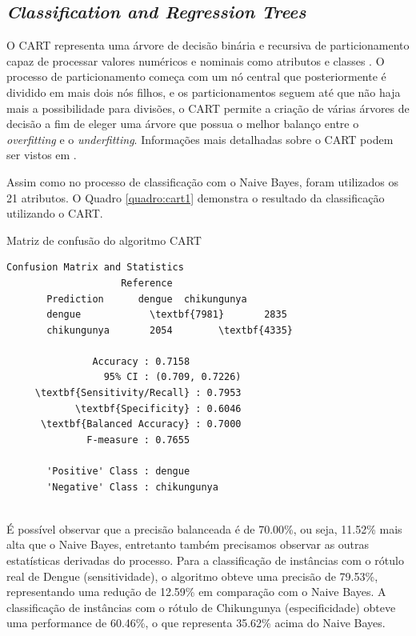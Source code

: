 \subsection{\textit{Classification and Regression Trees}}

O CART representa uma árvore de decisão binária e recursiva de particionamento capaz de processar valores numéricos e nominais como atributos e classes \cite{steinberg2009cart}. O processo de particionamento começa com um nó central que posteriormente é dividido em mais dois nós filhos, e os particionamentos seguem até que não haja mais a possibilidade para divisões, o CART permite a criação de várias árvores de decisão a fim de eleger uma árvore que possua o melhor balanço entre o \textit{overfitting} e o \textit{underfitting}. Informações mais detalhadas sobre o CART podem ser vistos em .

Assim como no processo de classificação com o Naive Bayes, foram utilizados os 21 atributos. O Quadro \ref{quadro:cart1} demonstra o resultado da classificação utilizando o CART.


\begin{quadro}
\caption{\label{quadro:cart1}Matriz de confusão do algoritmo CART}
\begingroup
    \fontsize{10pt}{9pt}\selectfont
    \begin{Verbatim}[commandchars=\\\{\}]
      Confusion Matrix and Statistics
                    Reference
       Prediction      dengue  chikungunya
       dengue            \textbf{7981}       2835
       chikungunya       2054        \textbf{4335}
                                         
               Accuracy : 0.7158         
                 95% CI : (0.709, 0.7226)
     \textbf{Sensitivity/Recall} : 0.7953         
            \textbf{Specificity} : 0.6046         
      \textbf{Balanced Accuracy} : 0.7000
              F-measure : 0.7655        
         
       'Positive' Class : dengue 
       'Negative' Class : chikungunya
  
    \end{Verbatim}  
\endgroup
{}
\end{quadro}

É possível observar que a precisão balanceada é de 70.00\%, ou seja, 11.52\% mais alta que o Naive Bayes, entretanto também precisamos observar as outras estatísticas derivadas do processo. Para a classificação de instâncias com o rótulo real de Dengue (sensitividade), o algoritmo obteve uma precisão de 79.53\%, representando uma redução de 12.59\% em comparação com o Naive Bayes. A classificação de instâncias com o rótulo de Chikungunya (especificidade) obteve uma performance de 60.46\%, o que representa 35.62\% acima do Naive Bayes.

